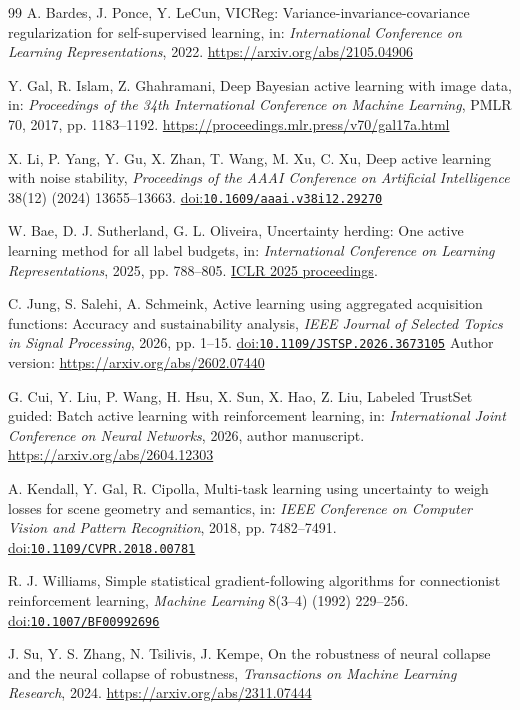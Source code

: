 \documentclass[10pt,a4paper,twocolumn]{article}
\providecommand{\doi}[1]{%
  \href{https://doi.org/#1}{doi:\nolinkurl{#1}}}
\begin{document}
\begin{thebibliography}{99}
A. Bardes, J. Ponce, Y. LeCun,
VICReg: Variance-invariance-covariance regularization for self-supervised learning,
in: \emph{International Conference on Learning Representations}, 2022.
\url{https://arxiv.org/abs/2105.04906}

Y. Gal, R. Islam, Z. Ghahramani,
Deep Bayesian active learning with image data,
in: \emph{Proceedings of the 34th International Conference
on Machine Learning}, PMLR 70, 2017, pp. 1183--1192.
\url{https://proceedings.mlr.press/v70/gal17a.html}

X. Li, P. Yang, Y. Gu, X. Zhan, T. Wang, M. Xu, C. Xu,
Deep active learning with noise stability,
\emph{Proceedings of the AAAI Conference on Artificial Intelligence}
38(12) (2024) 13655--13663.
\doi{10.1609/aaai.v38i12.29270}

W. Bae, D. J. Sutherland, G. L. Oliveira,
Uncertainty herding: One active learning method for all label budgets,
in: \emph{International Conference on Learning Representations}, 2025, pp. 788--805.
\href{https://proceedings.iclr.cc/paper_files/paper/2025/hash/0302fb83c62991efbccf0a003e4f5a92-Abstract-Conference.html}
{ICLR 2025 proceedings}.

C. Jung, S. Salehi, A. Schmeink,
Active learning using aggregated acquisition functions:
Accuracy and sustainability analysis,
\emph{IEEE Journal of Selected Topics in Signal Processing}, 2026, pp. 1--15.
\doi{10.1109/JSTSP.2026.3673105}
Author version: \url{https://arxiv.org/abs/2602.07440}

G. Cui, Y. Liu, P. Wang, H. Hsu, X. Sun, X. Hao, Z. Liu,
Labeled TrustSet guided: Batch active learning with reinforcement learning,
in: \emph{International Joint Conference on Neural Networks}, 2026,
author manuscript.
\url{https://arxiv.org/abs/2604.12303}

A. Kendall, Y. Gal, R. Cipolla,
Multi-task learning using uncertainty to weigh losses for scene geometry and semantics,
in: \emph{IEEE Conference on Computer Vision and Pattern Recognition},
2018, pp. 7482--7491.
\doi{10.1109/CVPR.2018.00781}

R. J. Williams,
Simple statistical gradient-following algorithms
for connectionist reinforcement learning,
\emph{Machine Learning} 8(3--4) (1992) 229--256.
\doi{10.1007/BF00992696}

J. Su, Y. S. Zhang, N. Tsilivis, J. Kempe,
On the robustness of neural collapse and the neural collapse of robustness,
\emph{Transactions on Machine Learning Research}, 2024.
\url{https://arxiv.org/abs/2311.07444}


\end{thebibliography}
\end{document}
